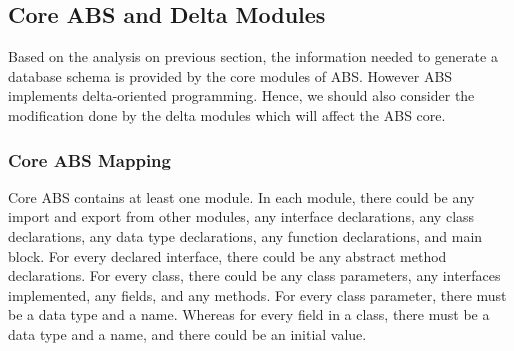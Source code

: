 \documentclass[runningheads,a4paper]{llncs}
\begin{document}
\subsection{Core ABS and Delta Modules}
Based on the analysis on previous section, the information needed to generate a database schema is provided by the core modules of ABS. However ABS implements delta-oriented programming. Hence, we should also consider the modification done by the delta modules which will affect the ABS core. 	

\subsubsection*{Core ABS Mapping}

Core ABS contains at least one module. In each module, there could be any import and export from other modules, any interface declarations, any class declarations, any data type declarations, any function declarations, and main block. For every declared interface, there could be any abstract method declarations. For every class, there could be any class parameters, any interfaces implemented, any fields, and any methods. For every class parameter, there must be a data type and a name. Whereas for every field in a class, there must be a data type and a name, and there could be an initial value. 
\end{document}

